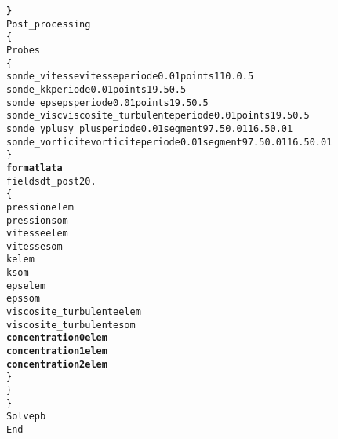 \begin{alltt}
    {\bf{\} }}
    Post_processing
    \{
        Probes 
        \{
            sonde_vitesse vitesse periode 0.01 points 1 10. 0.5
            sonde_k k periode 0.01 points 1 9.5 0.5
            sonde_eps eps periode 0.01 points 1 9.5 0.5
            sonde_visc viscosite_turbulente periode 0.01 points 1 9.5 0.5
            sonde_yplus y_plus periode 0.01 segment 9 7.5 0.01 16.5 0.01
            sonde_vorticite vorticite periode 0.01 segment 9 7.5 0.01 16.5 0.01
        \}
        {\bf{format lata}}
        fields dt_post 20.
        \{
            pression elem
            pression som
            vitesse elem
            vitesse som
            k elem
            k som
            eps elem
            eps som
            viscosite_turbulente elem
            viscosite_turbulente som
            {\bf{concentration0 elem}}
            {\bf{concentration1 elem}}
            {\bf{concentration2 elem}}
        \}
    \}
\}
Solve pb
End
\end{alltt}

